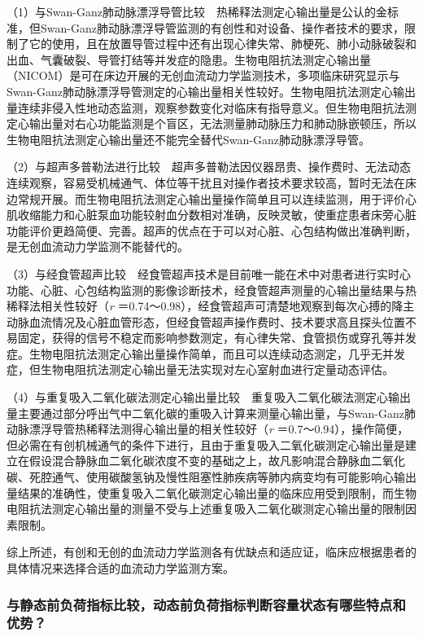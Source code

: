 （1）与Swan-Ganz肺动脉漂浮导管比较　热稀释法测定心输出量是公认的金标准，但Swan-Ganz肺动脉漂浮导管监测的有创性和对设备、操作者技术的要求，限制了它的使用，且在放置导管过程中还有出现心律失常、肺梗死、肺小动脉破裂和出血、气囊破裂、导管打结等并发症的隐患。生物电阻抗法测定心输出量（NICOM）是可在床边开展的无创血流动力学监测技术，多项临床研究显示与Swan-Ganz肺动脉漂浮导管测定的心输出量相关性较好。生物电阻抗法测定心输出量连续非侵入性地动态监测，观察参数变化对临床有指导意义。但生物电阻抗法测定心输出量对右心功能监测是个盲区，无法测量肺动脉压力和肺动脉嵌顿压，所以生物电阻抗法测定心输出量还不能完全替代Swan-Ganz肺动脉漂浮导管。

（2）与超声多普勒法进行比较　超声多普勒法因仪器昂贵、操作费时、无法动态连续观察，容易受机械通气、体位等干扰且对操作者技术要求较高，暂时无法在床边常规开展。而生物电阻抗法测定心输出量操作简单且可以连续监测，用于评价心肌收缩能力和心脏泵血功能较射血分数相对准确，反映灵敏，使重症患者床旁心脏功能评价更趋简便、完善。超声的优点在于可以对心脏、心包结构做出准确判断，是无创血流动力学监测不能替代的。

（3）与经食管超声比较　经食管超声技术是目前唯一能在术中对患者进行实时心功能、心脏、心包结构监测的影像诊断技术，经食管超声测量的心输出量结果与热稀释法相关性较好（\emph{r}
＝0.74～0.98），经食管超声可清楚地观察到每次心搏的降主动脉血流情况及心脏血管形态，但经食管超声操作费时、技术要求高且探头位置不易固定，获得的信号不稳定而影响参数测定，有心律失常、食管损伤或穿孔等并发症。生物电阻抗法测定心输出量操作简单，而且可以连续动态测定，几乎无并发症，但生物电阻抗法测定心输出量无法实现对左心室射血进行定量动态评估。

（4）与重复吸入二氧化碳法测定心输出量比较　重复吸入二氧化碳法测定心输出量主要通过部分呼出气中二氧化碳的重吸入计算来测量心输出量，与Swan-Ganz肺动脉漂浮导管热稀释法测得心输出量的相关性较好（\emph{r}
＝0.7～0.94），操作简便，但必需在有创机械通气的条件下进行，且由于重复吸入二氧化碳测定心输出量是建立在假设混合静脉血二氧化碳浓度不变的基础之上，故凡影响混合静脉血二氧化碳、死腔通气、使用碳酸氢钠及慢性阻塞性肺疾病等肺内病变均有可能影响心输出量结果的准确性，使重复吸入二氧化碳测定心输出量的临床应用受到限制，而生物电阻抗法测定心输出量的测量不受与上述重复吸入二氧化碳测定心输出量的限制因素限制。

综上所述，有创和无创的血流动力学监测各有优缺点和适应证，临床应根据患者的具体情况来选择合适的血流动力学监测方案。

\subsubsection{与静态前负荷指标比较，动态前负荷指标判断容量状态有哪些特点和优势？}

